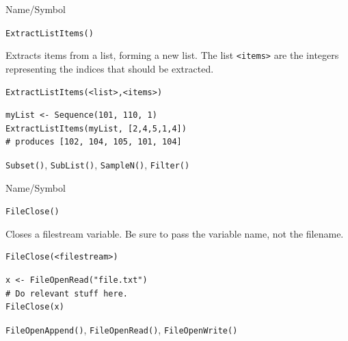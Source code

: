 \begin{desc}{Name/Symbol}
\item[Name/Symbol]	\verb+ExtractListItems()+

\item[Description]	Extracts items from a list, forming a new list. 
		The list \verb+<items>+ are the integers representing the
		indices that should be extracted.  
	     
\item[Usage]
\begin{verbatim}
ExtractListItems(<list>,<items>)
\end{verbatim}

\item[Example]
\begin{verbatim}
myList <- Sequence(101, 110, 1)
ExtractListItems(myList, [2,4,5,1,4])
# produces [102, 104, 105, 101, 104]
\end{verbatim}

\item[See Also]	\verb+Subset()+, \verb+SubList()+, \verb+SampleN()+, \verb+Filter()+
\end{desc}

\vfill
\newpage
{}
\vfill


\begin{desc}{Name/Symbol}
\item[Name/Symbol]	\verb+FileClose()+

\item[Description]	Closes a filestream  variable.  Be sure to 
		pass the variable name, not the filename.  

\item[Usage]
\begin{verbatim}
FileClose(<filestream>)
\end{verbatim}

\item[Example]
\begin{verbatim}
x <- FileOpenRead("file.txt")
# Do relevant stuff here.
FileClose(x)
\end{verbatim}

\item[See Also]	\verb+FileOpenAppend()+, \verb+FileOpenRead()+, \verb+FileOpenWrite()+

\end{desc}



